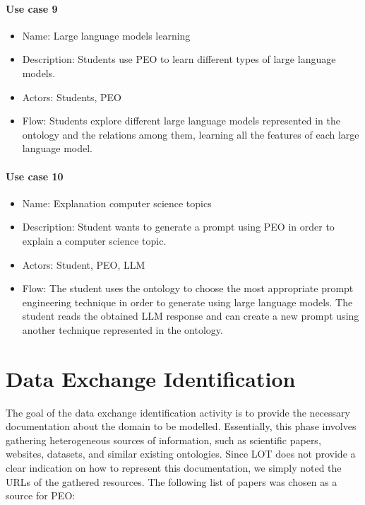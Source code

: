\paragraph{Use case 9}
\begin{itemize}
    \item Name: Large language models learning
    \item Description: Students use PEO to learn different types of large language models.
    \item Actors: Students, PEO
    \item Flow: Students explore different large language models represented in the ontology and the relations among them, learning all the features of each large language model.
\end{itemize}

\paragraph{Use case 10}
\begin{itemize}
    \item Name: Explanation computer science topics
    \item Description: Student wants to generate a prompt using PEO in order to explain a computer science topic.
    \item Actors: Student, PEO, LLM
    \item Flow: The student uses the ontology to choose the most appropriate prompt engineering technique in order to generate using large language models. The student reads the obtained LLM response and can create a new prompt using another technique represented in the ontology.
\end{itemize}

\section{Data Exchange Identification}
The goal of the data exchange identification activity is to provide the necessary documentation about the domain to be modelled.
Essentially, this phase involves gathering heterogeneous sources of information, such as scientific papers, websites, datasets, and similar existing ontologies.
Since LOT does not provide a clear indication on how to represent this documentation, we simply noted the URLs of the gathered resources.
The following list of papers was chosen as a source for PEO:


